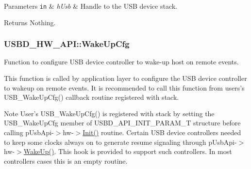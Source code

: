 \begin{DoxyParams}[1]{Parameters}
\mbox{\tt in}  & {\em h\-Usb} & Handle to the U\-S\-B device stack. \\
\hline
\end{DoxyParams}
\begin{DoxyReturn}{Returns}
Nothing. 
\end{DoxyReturn}
\hypertarget{structUSBD__HW__API_a9b6402065d4944bbd58235202fbd979f}{
\subsubsection[{Wake\-Up\-Cfg}]{ U\-S\-B\-D\-\_\-\-H\-W\-\_\-\-A\-P\-I\-::\-Wake\-Up\-Cfg}}\label{structUSBD__HW__API_a9b6402065d4944bbd58235202fbd979f}
Function to configure U\-S\-B device controller to wake-\/up host on remote events.

This function is called by application layer to configure the U\-S\-B device controller to wakeup on remote events. It is recommended to call this function from users's U\-S\-B\-\_\-\-Wake\-Up\-Cfg() callback routine registered with stack. \begin{DoxyNote}{Note}
User's U\-S\-B\-\_\-\-Wake\-Up\-Cfg() is registered with stack by setting the U\-S\-B\-\_\-\-Wake\-Up\-Cfg member of U\-S\-B\-D\-\_\-\-A\-P\-I\-\_\-\-I\-N\-I\-T\-\_\-\-P\-A\-R\-A\-M\-\_\-\-T structure before calling p\-Usb\-Api-\/$>$hw-\/$>$\hyperlink{structUSBD__HW__API_adfa3d0348994e49354243951f2ac95c9}{Init()} routine. Certain U\-S\-B device controllers needed to keep some clocks always on to generate resume signaling through p\-Usb\-Api-\/$>$hw-\/$>$\hyperlink{structUSBD__HW__API_aaf44f0d6be8e7e49782addd889cc7b98}{Wake\-Up()}. This hook is provided to support such controllers. In most controllers cases this is an empty routine.
\end{DoxyNote}

